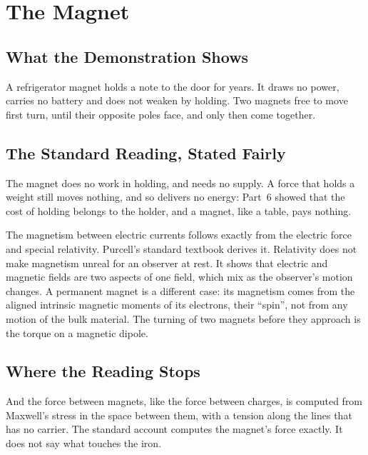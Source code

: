 \documentclass[11pt,a4paper]{article}
\begin{document}
\FloatBarrier
\section{The Magnet}
\label{sec:magnet}

\subsection*{What the Demonstration Shows}

A refrigerator magnet holds a note to the door for years. It draws no power, carries no battery and does not weaken by holding. Two magnets free to move first turn, until their opposite poles face, and only then come together.

\subsection*{The Standard Reading, Stated Fairly}

The magnet does no work in holding, and needs no supply. A force that holds a weight still moves nothing, and so delivers no energy: Part~6 showed that the cost of holding belongs to the holder, and a magnet, like a table, pays nothing.

The magnetism between electric currents follows exactly from the electric force and special relativity. Purcell's standard textbook derives it. Relativity does not make magnetism unreal for an observer at rest. It shows that electric and magnetic fields are two aspects of one field, which mix as the observer's motion changes. A permanent magnet is a different case: its magnetism comes from the aligned intrinsic magnetic moments of its electrons, their ``spin'', not from any motion of the bulk material. The turning of two magnets before they approach is the torque on a magnetic dipole.

\subsection*{Where the Reading Stops}

 And the force between magnets, like the force between charges, is computed from Maxwell's stress in the space between them, with a tension along the lines that has no carrier. The standard account computes the magnet's force exactly. It does not say what touches the iron.
\end{document}

